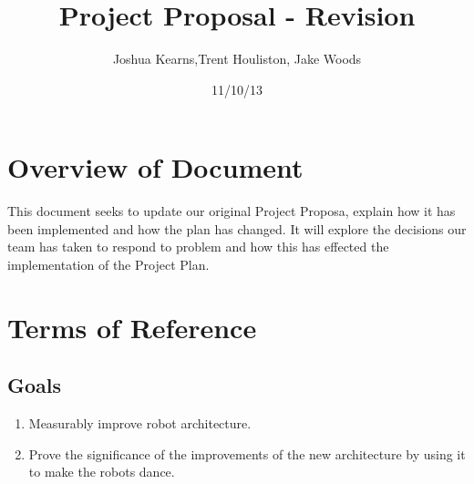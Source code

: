 \documentclass[a4paper]{article}
\title{Project Proposal - Revision}
\author{Joshua Kearns,Trent Houliston, Jake Woods}
\date{11/10/13}
\begin{document}
	\maketitle
	
	\clearpage
	\tableofcontents
	\clearpage

	\section{Overview of Document}
	This document seeks to update our original Project Proposa, explain how it has been implemented and how the plan has changed. It will explore the decisions our team has taken to respond to problem and how this has effected the implementation of the Project Plan.

	\section{Terms of Reference}
		\subsection {Goals}
			\begin{enumerate}
				\item Measurably improve robot architecture.
				\item Prove the significance of the improvements of the new architecture by using it to make the robots dance.
			\end{enumerate}
\end{document}
